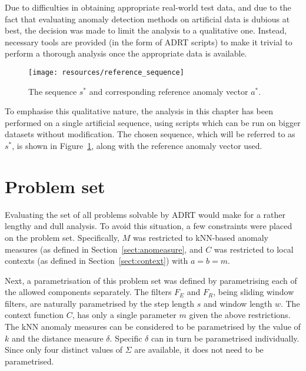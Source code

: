 Due to difficulties in obtaining appropriate real-world test data, and due to the fact that evaluating anomaly detection methods on artificial data is dubious at best, the decision was made to limit the analysis to a qualitative one. Instead, necessary tools are provided (in the form of ADRT scripts) to make it trivial to perform a thorough analysis once the appropriate data is available.

\begin{figure}[h]
    \begin{center}
        \texttt{[image: resources/reference\_sequence]}
    \end{center}
    \caption{\small{The sequence $s^*$ and corresponding reference anomaly vector $a^*$.}}
\label{fig:reference_sequence}
\end{figure}

To emphasise this qualitative nature, the analysis in this chapter has been performed on a single artificial sequence, using scripts which can be run on bigger datasets without modification. The chosen sequence, which will be referred to as $s^*$, is shown in Figure~\ref{fig:reference_sequence}, along with the reference anomaly vector used.

\section{Problem set}
Evaluating the set of all problems solvable by ADRT would make for a rather lengthy and dull analysis. To avoid this situation, a few constraints were placed on the problem set. Specifically, $M$ was restricted to kNN-based anomaly measures (as defined in Section~\ref{sect:anomeasure}, and $C$ was restricted to local contexts (as defined in Section~\ref{sect:context}) with $a = b = m$.

Next, a parametrisation of this problem set was defined by parametrising each of the allowed components separately. The filters $F_E$ and $F_R$, being sliding window filters, are naturally parametrised by the step length $s$ and window length $w$. The context function $C$, has only a single parameter $m$ given the above restrictions. The kNN anomaly measures can be considered to be parametrised by the value of $k$ and the distance measure $\delta$. Specific $\delta$ can in turn be parametrised individually. Since only four distinct values of $\Sigma$ are available, it does not need to be parametrised.

